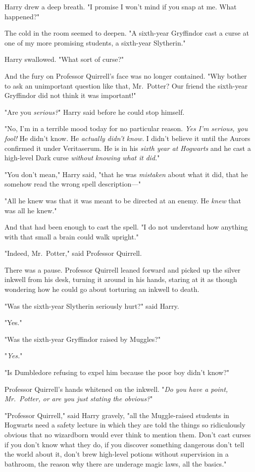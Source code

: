 Harry drew a deep breath. "I promise I won't mind if you snap at me. What
happened?"

The cold in the room seemed to deepen. "A sixth-year Gryffindor cast a curse at
one of my more promising students, a sixth-year Slytherin."

Harry swallowed. "What{\el} sort of curse?"

And the fury on Professor Quirrell's face was no longer contained. "Why bother
to ask an unimportant question like that, Mr.~Potter? Our friend the sixth-year
Gryffindor did not think it was important!"

"Are you \emph{serious?}" Harry said before he could stop himself.

"No, I'm in a terrible mood today for no particular reason. \emph{Yes I'm
serious, you fool!} He didn't know. He \emph{actually didn't know.} I didn't
believe it until the Aurors confirmed it under Veritaserum. He is in his
\emph{sixth year at Hogwarts} and he cast a high-level Dark curse \emph{without
knowing what it did.}"

"You don't mean," Harry said, "that he was \emph{mistaken} about what it did,
that he somehow read the wrong spell description\mbox{---}"

"All he knew was that it was meant to be directed at an enemy. He \emph{knew}
that was all he knew."

And that had been enough to cast the spell. "I do not understand how anything
with that small a brain could walk upright."

"Indeed, Mr.~Potter," said Professor Quirrell.

There was a pause. Professor Quirrell leaned forward and picked up the silver
inkwell from his desk, turning it around in his hands, staring at it as though
wondering how he could go about torturing an inkwell to death.

"Was the sixth-year Slytherin seriously hurt?" said Harry.

"Yes."

"Was the sixth-year Gryffindor raised by Muggles?"

"\emph{Yes.}"

"Is Dumbledore refusing to expel him because the poor boy didn't know?"

Professor Quirrell's hands whitened on the inkwell. "\emph{Do you have a point,
Mr.~Potter, or are you just stating the obvious?}"

"Professor Quirrell," said Harry gravely, "all the Muggle-raised students in
Hogwarts need a safety lecture in which they are told the things so
ridiculously obvious that no wizardborn would ever think to mention them. Don't
cast curses if you don't know what they do, if you discover something dangerous
don't tell the world about it, don't brew high-level potions without
supervision in a bathroom, the reason why there are underage magic laws, all
the basics."

